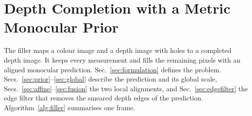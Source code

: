 \documentclass[conference]{IEEEtran}
\begin{document}
\section{Depth Completion with a Metric Monocular Prior}
\label{sec:filler}

The filler maps a colour image and a depth image with holes to a completed
depth image. It keeps every measurement and fills the remaining pixels with an
aligned monocular prediction. Sec.~\ref{sec:formulation} defines the problem.
Secs.~\ref{sec:prior}--\ref{sec:global} describe the prediction and its global
scale, Secs.~\ref{sec:affine}--\ref{sec:fusion} the two local alignments, and
Sec.~\ref{sec:edgefilter} the edge filter that removes the smeared depth edges
of the prediction. Algorithm~\ref{alg:filler} summarises one frame.
\end{document}
